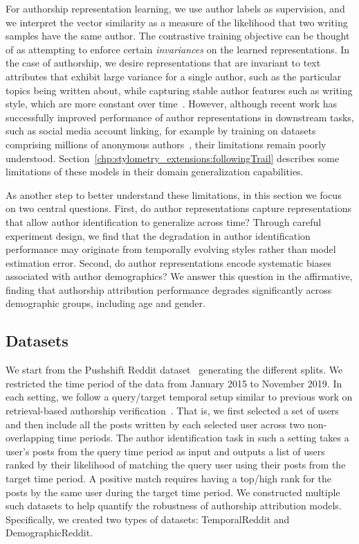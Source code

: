 For authorship representation learning, we use author labels as supervision, and we interpret the vector similarity as a measure of the likelihood that two writing samples have the same author. 
The contrastive training objective can be thought of as attempting to enforce certain \emph{invariances} on the learned representations.
In the case of authorship, we desire representations that are invariant to text attributes that exhibit large variance for a single author, such as the particular topics being written about, while capturing stable author features such as writing style, which are more constant over time~\cite{andrews2019learning}.
However, although recent work has successfully improved performance of author representations in downstream tasks, such as social media account linking, for example by training on datasets comprising millions of anonymous authors~\cite{khan2021deep}, their limitations remain poorly understood. 
Section~\ref{chp:stylometry_extensions:followingTrail} describes some limitations of these models in their domain generalization capabilities.

As another step to better understand these limitations, in this section we focus on two central questions. 
First, do author representations capture representations that allow author identification to generalize across time?
Through careful experiment design, we find that the degradation in author identification performance may originate from temporally evolving styles rather than model estimation error.
Second, do author representations encode systematic biases associated with author demographics? 
We answer this question in the affirmative, finding that authorship attribution performance degrades significantly across demographic groups, including age and gender. 

\subsection{Datasets}
We start from the Pushshift Reddit dataset~\cite{baumgartner2020pushshift} generating the different splits. 
We restricted the time period of the data from January 2015 to November 2019.
In each setting, we follow a query/target temporal setup similar to previous work on retrieval-based authorship verification~\cite{andrews2019learning,khan2021deep}.
That is, we first selected a set of users and then include all the posts written by each selected user across two non-overlapping time periods.
The author identification task in such a setting takes a user's posts from the query time period as input and outputs a list of users ranked by their likelihood of matching the query user using their posts from the target time period.
A positive match requires having a top/high rank for the posts by the same user during the target time period.
We constructed multiple such datasets to help quantify the robustness of authorship attribution models.
Specifically, we created two types of datasets: TemporalReddit and DemographicReddit.

